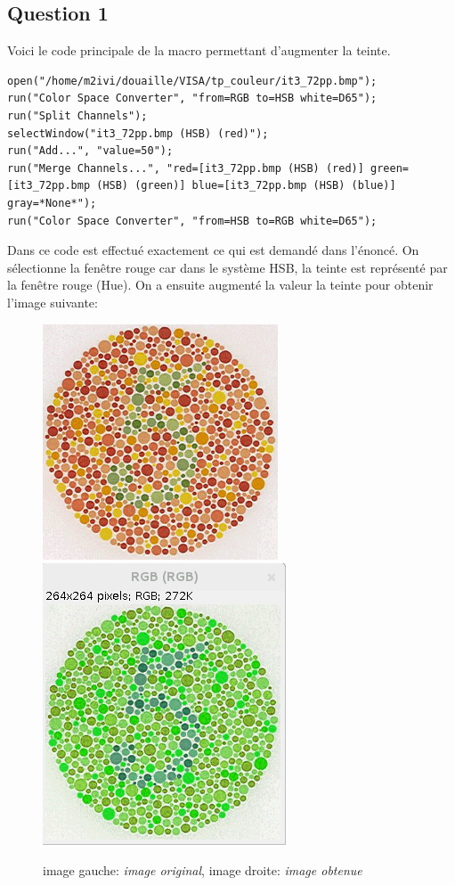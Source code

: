 \documentclass[a4paper,12pt]{report}
\begin{document}
\subsection*{Question 1}

Voici le code principale de la macro permettant d'augmenter la teinte.
\begin{lstlisting}[style=Java,caption={Code question 1},label=lst:question 1]
open("/home/m2ivi/douaille/VISA/tp_couleur/it3_72pp.bmp");
run("Color Space Converter", "from=RGB to=HSB white=D65");
run("Split Channels");
selectWindow("it3_72pp.bmp (HSB) (red)");
run("Add...", "value=50");
run("Merge Channels...", "red=[it3_72pp.bmp (HSB) (red)] green=[it3_72pp.bmp (HSB) (green)] blue=[it3_72pp.bmp (HSB) (blue)] gray=*None*");
run("Color Space Converter", "from=HSB to=RGB white=D65");
\end{lstlisting}

Dans ce code est effectué exactement ce qui est demandé dans l'énoncé. On sélectionne la fenêtre rouge car dans le système HSB, la teinte est représenté par la fenêtre rouge (Hue). On a ensuite augmenté la valeur la teinte pour obtenir l'image suivante:

\begin{figure}[!ht]
	\center
	\includegraphics[scale=0.5]{image/E2-41.png}	
	\includegraphics[scale=0.5]{image/E3-1.png}	
	\caption{image gauche: \textit{image original}, image droite: \textit{image obtenue}}
\end{figure} 
\end{document}
